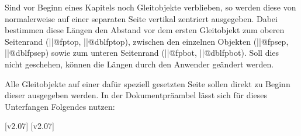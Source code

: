 \begin{Entity}{}
\begin{Declaration}
  {}
\begin{Declaration}
  {}
\begin{Declaration}
  {}
\begin{Declaration}
  {}
\begin{Declaration}
  {}
\begin{Declaration}
  {}
Sind vor Beginn eines Kapitels noch Gleitobjekte verblieben, so werden diese 
von  normalerweise auf einer separaten Seite vertikal zentriert 
ausgegeben. Dabei bestimmen diese Längen den Abstand vor dem ersten Gleitobjekt 
zum oberen Seitenrand (\Length||{@fptop}, \Length||{@dblfptop}), zwischen den 
einzelnen Objekten (\Length||{@fpsep}, \Length||{@dblfpsep}) sowie zum unteren 
Seitenrand (\Length||{@fpbot}, \Length||{@dblfpbot}). Soll dies nicht 
geschehen, können die Längen durch den Anwender geändert werden.
\end{Declaration}
\end{Declaration}
\end{Declaration}
\end{Declaration}
\end{Declaration}
\end{Declaration}
%
\begin{Example}
Alle Gleitobjekte auf einer dafür speziell gesetzten Seite sollen direkt zu 
Beginn dieser ausgegeben werden. In der Dokumentpräambel lässt sich für dieses 
Unterfangen Folgendes nutzen:
\begin{Code}
\makeatletter
\setlength{\@fptop}{0pt}
\setlength{\@dblfptop}{0pt}%
\makeatother
\end{Code}
\end{Example}
\end{Entity}
[v2.07]
[v2.07]



